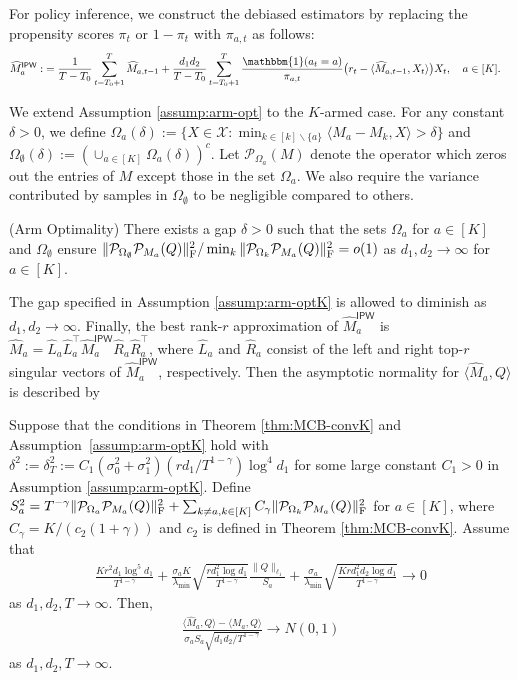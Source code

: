 \documentclass[12pt]{article}
\newcommand\fro[1]{\| #1 \|_{\rm{F}}}
\newcommand{\inp}[2]{\langle #1,#2\rangle}
\def\calP{{\mathcal P}}
\def\hat{\widehat}
\def\uipw{\textsf{IPW}}
\theoremstyle{plain}
\begin{document}
For policy inference, we construct the debiased estimators by replacing the propensity scores $\pi_t$ or $1-\pi_t$ with $\pi_{a,t}$ as follows:
\begin{align}\label{eq:debias-awK}
\hat M_a^{\uipw}:&= \frac{1}{T-T_0}\sum_{t=T_0+1}^ T\hat M_{a, t-1}+\frac{d_1d_2}{T-T_0}\sum_{t=T_0+1}^T \frac{\mathbbm{1}(a_t=a)}{\pi_{a,t}} \big(r_t-\langle \hat M_{a, t-1}, X_t\rangle\big)X_t,\quad a\in[K].
\end{align}

We extend Assumption \ref{assump:arm-opt} to the $K$-armed case. For any constant $\delta>0$, we define $\Omega_a(\delta):= \{X\in \mathcal{X}: \min_{k\in [k]\backslash \{a\}} \inp{M_a-M_k}{X}>\delta\}$ and $\Omega_{\emptyset}(\delta):=(\cup_{a\in [K]} \Omega_a(\delta))^c$. Let $\mathcal{P}_{\Omega_a}(M)$ denote the operator which zeros out the entries of $M$ except those in the set $\Omega_a$. We also require the variance contributed by samples in $\Omega_{\emptyset}$ to be negligible compared to others. 
\begin{assump}
\label{assump:arm-optK}(Arm Optimality)
There exists a gap $\delta>0$ such that the sets $\Omega_a$ for $a\in [K]$ and $\Omega_{\emptyset}$ ensure 
$\fro{\calP_{\Omega_{\emptyset}}\calP_{M_a}(Q)}^2/\min_k{\fro{\calP_{\Omega_{k}}\calP_{M_a}(Q)}^2}=o(1)$ as $d_1, d_2\to\infty$ for $a\in [K]$.
\end{assump}
The gap specified in Assumption \ref{assump:arm-optK} is allowed to diminish as $d_1,d_2\rightarrow \infty$. Finally, the best rank-$r$ approximation of $\widehat{M}_a^{\uipw}$ is $\hat M_a=\widehat{L}_a\widehat{L}_a^{\top}\widehat{M}_a^{\uipw}\widehat{R}_a\widehat{R}_a^{\top}$, where $\widehat{L}_a$ and $\widehat{R}_a$ consist of the left and right top-$r$ singular vectors of $\widehat{M}_a^{\uipw}$, respectively. Then the asymptotic normality for $\inp{\widehat{M}_a}{Q}$ is described by
\begin{thm}\label{thm:CLTK}
Suppose that the conditions in Theorem \ref{thm:MCB-convK} and Assumption~\ref{assump:arm-optK} hold with $\delta^2:=\delta_T^2:=C_1(\sigma_0^2+\sigma_1^2)(rd_1/T^{1-\gamma})\log^4d_1$ for some large constant $C_1>0$ in Assumption \ref{assump:arm-optK}. Define $S_a^2=T^{-\gamma}\fro{\calP_{\Omega_a}\calP_{M_a}(Q)}^2+\sum_{k\neq a, k\in [K]} C_{\gamma}\fro{\calP_{\Omega_k}\calP_{M_a}(Q)}^2$ for $a\in [K]$, where $C_{\gamma}=K/(c_2(1+\gamma))$ and $c_2$ is defined in Theorem \ref{thm:MCB-convK}. Assume that  
\begin{align}
\frac{Kr^2d_1\log^5d_1}{T^{1-\gamma}} + \frac{\sigma_aK}{\lambda_{\min}}\sqrt{\frac{rd_1^2\log d_1}{T^{1-\gamma}}} \frac{\|Q\|_{\ell_1}}{S_a} + \frac{\sigma_a}{\lambda_{\min}}\sqrt{\frac{Krd_1^2d_2\log d_1}{T^{1-\gamma}}} \rightarrow 0
\end{align}
as $d_1, d_2, T\to\infty$. Then, 
\begin{align}
    \frac{\langle \hat M_a, Q\rangle - \langle M_a, Q\rangle}{\sigma_aS_a \sqrt{d_1d_2/T^{1-\gamma}}}\rightarrow N(0,1)
\end{align}
as $d_1,d_2, T\to\infty$. 
\end{thm}
\end{document}
